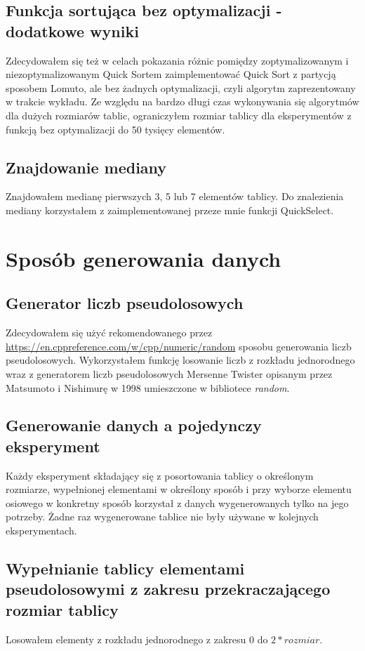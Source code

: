 \documentclass{article}
\begin{document}
    \subsection{Funkcja sortująca bez optymalizacji - dodatkowe wyniki}
    Zdecydowałem się też w celach pokazania różnic pomiędzy zoptymalizowanym i niezoptymalizowanym Quick Sortem zaimplementować Quick Sort z partycją sposobem Lomuto, ale bez żadnych optymalizacji, czyli algorytm zaprezentowany w trakcie wykładu. Ze względu na bardzo długi czas wykonywania się algorytmów dla dużych rozmiarów tablic, ograniczyłem rozmiar tablicy dla eksperymentów z funkcją bez optymalizacji do 50 tysięcy elementów.
    
    \subsection{Znajdowanie mediany}
    Znajdowałem medianę pierwszych 3, 5 lub 7 elementów tablicy. Do znalezienia mediany korzystałem z zaimplementowanej przeze mnie funkcji QuickSelect.

\section{Sposób generowania danych}
    \subsection{Generator liczb pseudolosowych}
    Zdecydowałem się użyć rekomendowanego przez \url{https://en.cppreference.com/w/cpp/numeric/random} sposobu generowania liczb pseudolosowych. Wykorzystałem funkcję losowanie liczb z rozkładu jednorodnego wraz z generatorem liczb pseudolosowych Mersenne Twister opisanym przez Matsumoto i Nishimurę w 1998 umieszczone w bibliotece \textit{random}.
    
    \subsection{Generowanie danych a pojedynczy eksperyment}
    Każdy eksperyment składający się z posortowania tablicy o określonym rozmiarze, wypełnionej elementami w określony sposób i przy wyborze elementu osiowego w konkretny sposób korzystał z danych wygenerowanych tylko na jego potrzeby. Żadne raz wygenerowane tablice nie były używane w kolejnych eksperymentach.
    
    \subsection{Wypełnianie tablicy elementami pseudolosowymi z zakresu przekraczającego rozmiar tablicy}
    Losowałem elementy z rozkładu jednorodnego z zakresu \(0\) do \(2 * rozmiar\).
    
\end{document}
